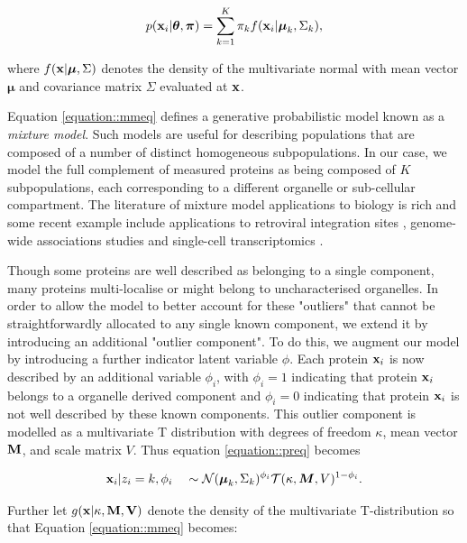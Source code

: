 \documentclass[12pt,english]{article}\usepackage[]{graphicx}\usepackage[]{color}
\begin{document}
\begin{align}
p({\bf x}_i | \boldsymbol{\theta}, \boldsymbol{\pi} ) = \sum_{k = 1}^K \pi_k f({\bf x}_i|\boldsymbol{\mu}_k, \Sigma_k),\label{equation::mmeq}
\end{align}

where $f({\bf x} | \boldsymbol{\mu}, \Sigma)$ denotes the density of
the multivariate normal with mean vector $\boldsymbol{\mu}$ and
covariance matrix $\Sigma$ evaluated at ${\bf x}$.

Equation \eqref{equation::mmeq} defines a generative probabilistic
model known as a {\em mixture model}.  Such models are useful for
describing populations that are composed of a number of distinct
homogeneous subpopulations.  In our case, we model the full complement
of measured proteins as being composed of $K$ subpopulations, each
corresponding to a different organelle or sub-cellular
compartment. The literature of mixture model applications to biology
is rich and some recent example include applications to retroviral
integration sites \citep{Kirk:2016}, genome-wide associations studies
\citep{Liley:2017} and single-cell transcriptomics
\citep{Lonnberg:2017}.

Though some proteins are well described as belonging to a single
component, many proteins multi-localise or might belong to
uncharacterised organelles. In order to allow the model to better
account for these "outliers" that cannot be straightforwardly
allocated to any single known component, we extend it by introducing
an additional "outlier component". To do this, we augment our model by
introducing a further indicator latent variable $\phi$. Each protein
${\bf x}_i$ is now described by an additional variable $\phi_i$, with
$\phi_i = 1$ indicating that protein ${\bf x}_i$ belongs to a
organelle derived component and $\phi_i = 0$ indicating that protein
${\bf x}_i$ is not well described by these known components. This
outlier component is modelled as a multivariate T distribution with
degrees of freedom $\kappa$, mean vector $\bf{M}$, and scale matrix
$V$. Thus equation \eqref{equation::preq} becomes

\begin{align}
{\bf x}_i | z_i = k, \phi_i \quad \sim \mathcal{N}(\boldsymbol{\mu}_k, \Sigma_k)^{\phi_i}\mathcal{T}(\kappa, \boldsymbol{M}, V)^{1 - \phi_i }.
\end{align}

Further let $g({\bf x | \kappa, \bf{M}, V} )$ denote the density of
the multivariate T-distribution so that Equation
\eqref{equation::mmeq} becomes:
\end{document}
